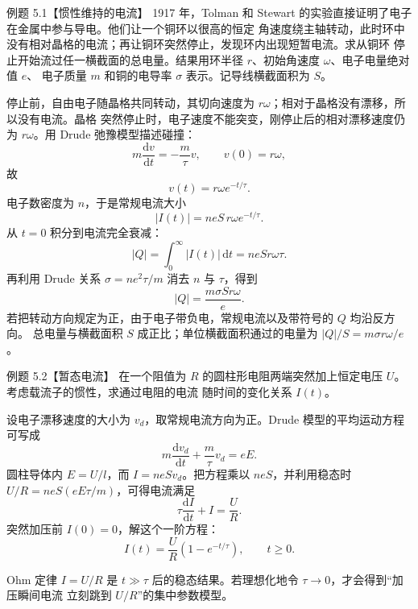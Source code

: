 \begin{origexamplebox}{例题 5.1【惯性维持的电流】}
1917 年，Tolman 和 Stewart 的实验直接证明了电子在金属中参与导电。他们让一个铜环以很高的恒定
角速度绕主轴转动，此时环中没有相对晶格的电流；再让铜环突然停止，发现环内出现短暂电流。求从铜环
停止开始流过任一横截面的总电量。结果用环半径 $r$、初始角速度 $\omega$、电子电量绝对值 $e$、
电子质量 $m$ 和铜的电导率 $\sigma$ 表示。记导线横截面积为 $S$。
\end{origexamplebox}

\tolmanRingFigure
{}

\begin{xesolution}
停止前，自由电子随晶格共同转动，其切向速度为 $r\omega$；相对于晶格没有漂移，所以没有电流。晶格
突然停止时，电子速度不能突变，刚停止后的相对漂移速度仍为 $r\omega$。用 Drude 弛豫模型描述碰撞：
\[
  m\frac{\mathrm dv}{\mathrm dt}=-\frac m\tau v,
  \qquad v(0)=r\omega,
\]
故
\[
  v(t)=r\omega e^{-t/\tau}.
\]
电子数密度为 $n$，于是常规电流大小
\[
  |I(t)|=neS\,r\omega e^{-t/\tau}.
\]
从 $t=0$ 积分到电流完全衰减：
\[
  |Q|=\int_0^\infty |I(t)|\,\mathrm dt=neSr\omega\tau.
\]
再利用 Drude 关系 $\sigma=ne^2\tau/m$ 消去 $n$ 与 $\tau$，得到
\[
  \boxed{|Q|=\frac{m\sigma S r\omega}{e}}.
\]
若把转动方向规定为正，由于电子带负电，常规电流以及带符号的 $Q$ 均沿反方向。
总电量与横截面积 $S$ 成正比；单位横截面积通过的电量为
$|Q|/S=m\sigma r\omega/e$。
\end{xesolution}

\begin{origexamplebox}{例题 5.2【暂态电流】}
在一个阻值为 $R$ 的圆柱形电阻两端突然加上恒定电压 $U$。考虑载流子的惯性，求通过电阻的电流
随时间的变化关系 $I(t)$。
\end{origexamplebox}

\begin{xesolution}
设电子漂移速度的大小为 $v_d$，取常规电流方向为正。Drude 模型的平均运动方程可写成
\[
  m\frac{\mathrm dv_d}{\mathrm dt}+\frac m\tau v_d=eE.
\]
圆柱导体内 $E=U/l$，而 $I=neSv_d$。把方程乘以 $neS$，并利用稳态时
$U/R=neS(eE\tau/m)$，可得电流满足
\[
  \tau\frac{\mathrm dI}{\mathrm dt}+I=\frac UR.
\]
突然加压前 $I(0)=0$，解这个一阶方程：
\[
  \boxed{I(t)=\frac UR\left(1-e^{-t/\tau}\right),\qquad t\ge0}.
\]

\transientCurrentFigure
{}

Ohm 定律 $I=U/R$ 是 $t\gg\tau$ 后的稳态结果。若理想化地令 $\tau\to0$，才会得到“加压瞬间电流
立刻跳到 $U/R$”的集中参数模型。
\end{xesolution}

